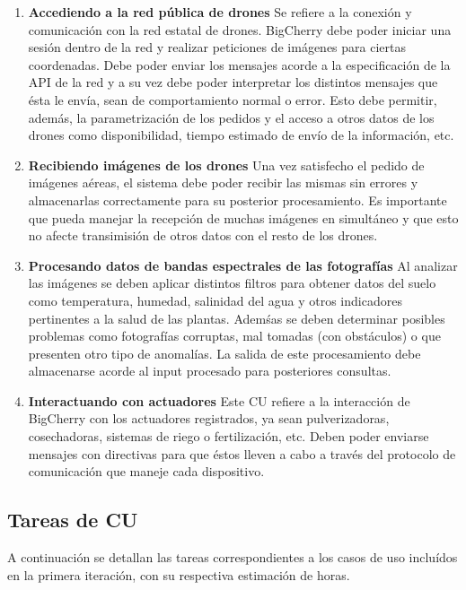 \begin{enumerate}
	\item \textbf{Accediendo a la red pública de drones}
	Se refiere a la conexión y comunicación con la red estatal de drones. BigCherry debe poder iniciar una sesión dentro de la red y realizar peticiones de imágenes para ciertas coordenadas. Debe poder enviar los mensajes acorde a la especificación de la API de la red y a su vez debe poder interpretar los distintos mensajes que ésta le envía, sean de comportamiento normal o error. Esto debe permitir, además, la parametrización de los pedidos y el acceso a otros datos de los drones como disponibilidad, tiempo estimado de envío de la información, etc.

	\item \textbf{Recibiendo imágenes de los drones}
	Una vez satisfecho el pedido de imágenes aéreas, el sistema debe poder recibir las mismas sin errores y almacenarlas correctamente para su posterior procesamiento. Es importante que pueda manejar la recepción de muchas imágenes en simultáneo y que esto no afecte transimisión de otros datos con el resto de los drones.

	\item \textbf{Procesando datos de bandas espectrales de las fotografías}
	Al analizar las imágenes se deben aplicar distintos filtros para obtener datos del suelo como temperatura, humedad, salinidad del agua y otros indicadores pertinentes a la salud de las plantas. Ademśas se deben determinar posibles problemas como fotografías corruptas, mal tomadas (con obstáculos) o que presenten otro tipo de anomalías. La salida de este procesamiento debe almacenarse acorde al input procesado para posteriores consultas.

	\item \textbf{Interactuando con actuadores} 
	Este CU refiere a la interacción de BigCherry con los actuadores registrados, ya sean pulverizadoras, cosechadoras, sistemas de riego o fertilización, etc. Deben poder enviarse mensajes con directivas para que éstos lleven a cabo a través del protocolo de comunicación que maneje cada dispositivo.
\end{enumerate}

\clearpage

\subsection{Tareas de CU}

A continuación se detallan las tareas correspondientes a los casos de uso incluídos en la primera iteración, con su respectiva estimación de horas.

